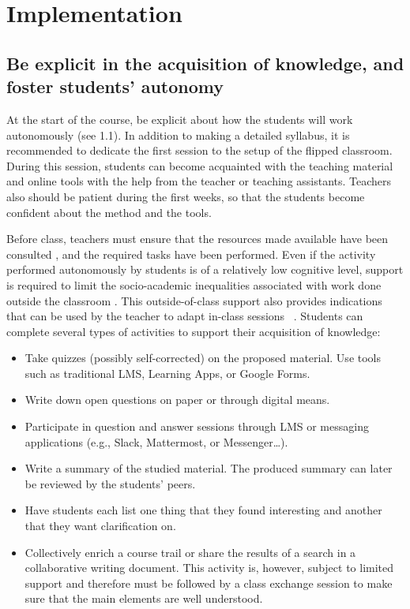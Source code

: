\documentclass[10pt,letterpaper]{article}
\begin{document}
\section{Implementation}

\subsection{Be explicit in the acquisition of knowledge, and foster students' autonomy}

At the start of the course, be explicit about how the students will
work autonomously (see 1.1). In addition to making a detailed syllabus, it is recommended to dedicate the first session to the setup of the flipped classroom. During this session, students can become acquainted with the teaching material and online tools with the help from the teacher or teaching assistants. Teachers also should be patient during the first weeks, so that the students become confident about the method and the tools.

Before class, teachers must ensure that the resources made available
have been consulted \cite{lo_critical_2017}, and the required tasks have been performed. 
Even if the activity performed autonomously by students is of a relatively low cognitive level, support is required to limit the socio-academic inequalities associated with work done outside the classroom \cite{rayou_faire_2010}. This outside-of-class support also provides indications that can be used by the teacher to adapt in-class sessions ~\cite{fidalgo2017apft}.
Students can complete several types of activities to support their acquisition of knowledge:

\begin{itemize}

\item Take quizzes (possibly self-corrected) on the proposed material. 
Use tools such as traditional LMS, Learning Apps, or Google Forms.

\item Write down open questions on paper or through digital means.

\item Participate in question and answer sessions through LMS or messaging applications (e.g., Slack, Mattermost, or Messenger\ldots).

\item Write a summary of the studied material. 
The produced summary can later be reviewed by the students’ peers.

\item Have students each list one thing that they found interesting and another that they want clarification on.

\item Collectively enrich a course trail or share the results of a search in a collaborative writing document. 
This activity is, however, subject to limited support and therefore must be followed by a class exchange session to make sure that the main elements are well understood.

\end{itemize}
\end{document}

